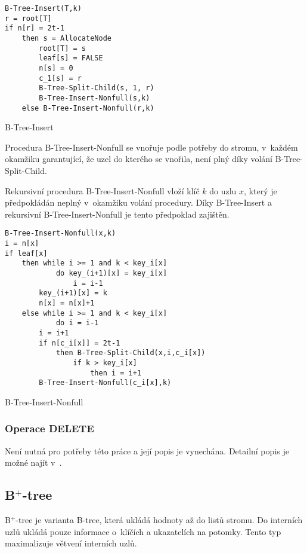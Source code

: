 \begin{algorithm}[t]
\begin{lstlisting}
B-Tree-Insert(T,k)
r = root[T]
if n[r] = 2t-1
	then s = AllocateNode
		root[T] = s
		leaf[s] = FALSE
		n[s] = 0
		c_1[s] = r
		B-Tree-Split-Child(s, 1, r)
		B-Tree-Insert-Nonfull(s,k)
	else B-Tree-Insert-Nonfull(r,k)
\end{lstlisting}


\caption{B-Tree-Insert}
\end{algorithm}


Procedura B-Tree-Insert-Nonfull se vnořuje podle potřeby do stromu,
v~každém okamžiku garantující, že uzel do kterého se vnořila, není
plný díky volání B-Tree-Split-Child\@.

Rekursivní procedura B-Tree-Insert-Nonfull vloží klíč $k$ do uzlu
$x$, který je předpokládán neplný v~okamžiku volání procedury\@.
Díky B-Tree-Insert a rekursivní B-Tree-Insert-Nonfull je tento předpoklad
zajištěn\@.

\begin{algorithm}[t]
\begin{lstlisting}
B-Tree-Insert-Nonfull(x,k)
i = n[x]
if leaf[x]
	then while i >= 1 and k < key_i[x]
			do key_(i+1)[x] = key_i[x]
				i = i-1
		key_(i+1)[x] = k
		n[x] = n[x]+1
	else while i >= 1 and k < key_i[x]
			do i = i-1
		i = i+1
		if n[c_i[x]] = 2t-1
			then B-Tree-Split-Child(x,i,c_i[x])
				if k > key_i[x]
					then i = i+1
		B-Tree-Insert-Nonfull(c_i[x],k)
\end{lstlisting}


\caption{B-Tree-Insert-Nonfull}
\end{algorithm}



\subsubsection{Operace DELETE}

Není nutná pro potřeby této práce a její popis je vynechána\@. Detailní
popis je možné najít v~\cite{Cormen:2001:IA:580470}\@.


\subsection{B$^{\text{+}}$-tree\label{sub:B-plus-tree}}

B$^{\text{+}}$-tree je varianta B-tree, která ukládá hodnoty až do
listů stromu. Do interních uzlů ukládá pouze informace o~klíčích
a ukazatelích na potomky. Tento typ maximalizuje větvení interních
uzlů.

